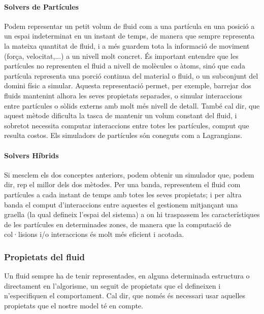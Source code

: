 \documentclass[a4paper]{report}
\begin{document}
	\paragraph[Partícules]{Solvers de Partícules} Podem representar un petit volum de fluid com a una partícula en una posició a un espai indeterminat en un instant de temps, de manera que sempre representa la mateixa quantitat de fluid, i a més guardem tota la informació de moviment (força, velocitat,...) a un nivell molt concret. \newline
	És important entendre que les partícules no representen el fluid a nivell de molècules o àtoms, sinó que cada partícula representa una porció continua del material o fluid, o un subconjunt del domini físic a simular. 
	\newline
	Aquesta representació permet, per exemple, barrejar dos fluids mantenint alhora les seves propietats separades, o simular interaccions entre partícules o sòlids externs amb molt més nivell de detall.
	També cal dir, que aquest mètode dificulta la tasca de mantenir un volum constant del fluid, i sobretot necessita computar interaccions entre totes les partícules, comput que resulta costos. \newline
	Els simuladors de partícules són coneguts com a Lagrangians.
	\paragraph[Híbrids]{Solvers Híbrids} Si mesclem els dos conceptes anteriors, podem obtenir un simulador que, podem dir, rep el millor dels dos mètodes.\newline
	Per una banda, representem el fluid com partícules a cada instant de temps amb totes les seves propietats; i per altra banda el comput d'interaccions entre aquestes el gestionem mitjançant una graella (la qual defineix l'espai del sistema) a on hi traspassem les característiques de les partícules en determinades zones, de manera que la computació de col·lisions i/o interaccions és molt més eficient i acotada.   
	
	\subsubsection{Propietats del fluid} 
	Un fluid sempre ha de tenir representades, en alguna determinada estructura o directament en l'algorisme, un seguit de propietats que el defineixen i n'especifiquen el comportament. Cal dir, que només és necessari usar aquelles propietats que el nostre model té en compte.
\end{document}
